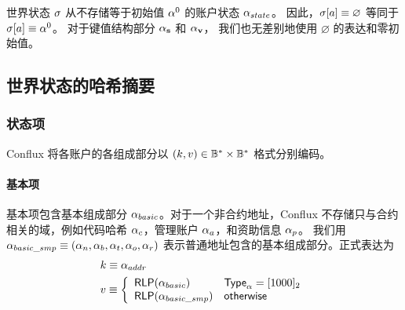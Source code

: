 世界状态 $\mathbf{\sigma}$ 从不存储等于初始值 $\mathbf{\alpha}^0$ 的账户状态 $\mathbf{\alpha}_{state}$。
因此，$\mathbf{\sigma}[a]\equiv \varnothing$ 等同于 $\mathbf{\sigma}[a]\equiv \mathbf{\alpha}^0$。
对于键值结构部分 $\mathbf{\alpha}_{\bf s}$ 和 $\mathbf{\alpha}_{\bf v}$， 我们也无差别地使用 $\varnothing$ 的表达和零初始值。

\subsection{世界状态的哈希摘要}

\subsubsection{状态项}

Conflux 将各账户的各组成部分以 $(k,v)\in \mathbb{B}^*\times \mathbb{B}^*$ 格式分别编码。

\paragraph{基本项} 基本项包含基本组成部分 $\mathbf{\alpha}_{basic}$。对于一个非合约地址，Conflux 不存储只与合约相关的域，例如代码哈希 $\mathbf{\alpha}_c$，管理账户 $\mathbf{\alpha}_a$，和资助信息 $\mathbf{\alpha}_p$。
我们用 $\mathbf{\alpha}_{basic\_smp}\equiv (\mathbf{\alpha}_n, \mathbf{\alpha}_b, \mathbf{\alpha}_t, \mathbf{\alpha}_o, \mathbf{\alpha}_r)$ 表示普通地址包含的基本组成部分。正式表达为
\begin{align}
	&k\equiv \alpha_{addr}\\
	&v\equiv \left\{\begin{array}{ll}
		\mathsf{RLP}(\mathbf{\alpha}_{basic}) & \mathsf{Type}_\alpha=[1000]_2 \\
		\mathsf{RLP}(\mathbf{\alpha}_{basic\_smp}) & \mathsf{otherwise}
	\end{array}\right.
\end{align}
	
